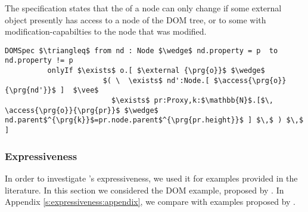 The specification  states that the  of a node can only change if
some external object presently has 
access to a node of the DOM tree, or to some  with modification-capabilties
to the node that was modified.
\begin{lstlisting}[language = Chainmail, mathescape=true, frame=lines]
DOMSpec $\triangleq$ from nd : Node $\wedge$ nd.property = p  to nd.property != p
          onlyIf $\exists$ o.[ $\external {\prg{o}}$ $\wedge$ 
                       $( \  \exists$ nd':Node.[ $\access{\prg{o}}{\prg{nd'}}$ ]  $\vee$ 
                         $\exists$ pr:Proxy,k:$\mathbb{N}$.[$\, \access{\prg{o}}{\prg{pr}}$ $\wedge$ nd.parent$^{\prg{k}}$=pr.node.parent$^{\prg{pr.height}}$ ] $\,$ ) $\,$ ]
\end{lstlisting}

\subsubsection{Expressiveness}
In order to investigate \Nec's expressiveness,  
we used it for
examples provided in the literature. In this section we considered the DOM example, 
proposed by  \citeauthor{dd}. In Appendix \ref{s:expressiveness:appendix},
we compare with examples proposed by  \citeauthor{FASE}.
 


